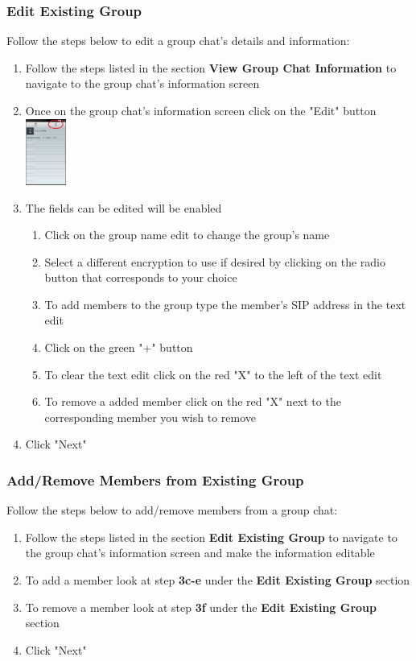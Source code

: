 \documentclass[11pt]{article}
\begin{document}
\subsubsection*{Edit Existing Group}
Follow the steps below to edit a group chat's details and information:
\begin{enumerate}
\item Follow the steps listed in the section \textbf{View Group Chat Information} to navigate to the group chat's information screen
\item Once on the group chat's information screen click on the "Edit" button\\
\includegraphics[width=50px]{images/groupchatInfoEdit.png}
\item The fields can be edited will be enabled
\begin{enumerate}
\item Click on the group name edit to change the group's name
\item Select a different encryption to use if desired by clicking on the radio button that corresponds to your choice
\item To add members to the group type the member's SIP address in the text edit
\item Click on the green "+" button
\item To clear the text edit click on the red "X" to the left of the text edit
\item To remove a added member click on the red "X" next to the corresponding member you wish to remove
\end{enumerate}
\item Click "Next"
\end{enumerate}


\subsubsection*{Add/Remove Members from Existing Group}
Follow the steps below to add/remove members from a group chat:
\begin{enumerate}
\item Follow the steps listed in the section \textbf{Edit Existing Group} to navigate to the group chat's information screen and make the information editable
\item To add a member look at step \textbf{3c-e} under the \textbf{Edit Existing Group} section
\item To remove a member look at step \textbf{3f} under the \textbf{Edit Existing Group} section
\item Click "Next"
\end{enumerate}
\end{document}

